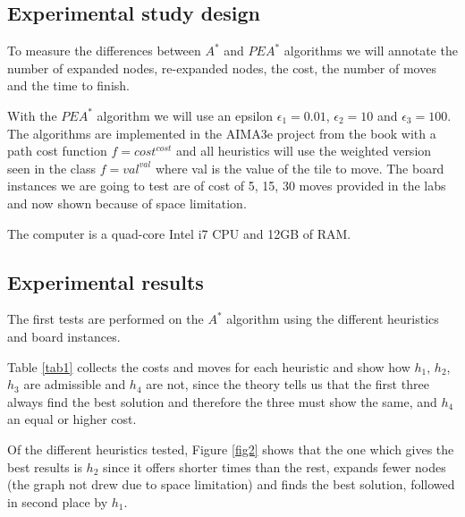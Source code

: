 \documentclass[runningheads]{llncs}
\begin{document}
\subsection{Experimental study design}
To measure the differences between $A^*$ and \(PEA^*\) algorithms we will annotate 
the number of expanded nodes, re-expanded nodes, the cost, the number of moves and the time to finish.

With the \(PEA^*\) algorithm we will use an epsilon $\epsilon_1=0.01$, $\epsilon_2=10$ and $\epsilon_3=100$.
The algorithms are implemented in the AIMA3e project from the book \cite{algorithms_2} with a path cost function $f={cost}^{cost}$ and 
all heuristics will use the weighted version seen in the class $f={val}^{val}$ 
where val is the value of the tile to move.
The board instances we are going to test are of cost of 5, 15, 30 moves provided in the labs and now shown because of space limitation.

The computer is a quad-core Intel i7 CPU and 12GB of RAM.
\subsection{Experimental results}
The first tests are performed on the \(A^*\) algorithm using the different heuristics and board instances.

Table \ref{tab1} collects the costs and moves for each heuristic and show how $h_1$, $h_2$, $h_3$ are admissible and $h_4$ are not,
since the theory tells us that the first three always find the best solution and therefore the three must show the same, and $h_4$ an equal or higher cost.

Of the different heuristics tested, Figure \ref{fig2} shows that the one which gives the best results is $h_2$ since it offers shorter times than the rest,
expands fewer nodes (the graph not drew due to space limitation) and finds the best solution, followed in second place by $h_1$.
\end{document}

